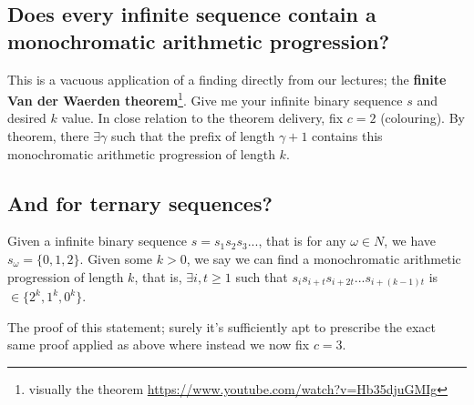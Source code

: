 \documentclass{article}
\begin{document}
\subsection{Does every infinite sequence contain a monochromatic arithmetic progression?}
This is a vacuous application of a finding directly from our lectures; the \textbf{finite Van der Waerden theorem}\footnote{visually the theorem \url{https://www.youtube.com/watch?v=Hb35djuGMIg}}. Give me your infinite binary sequence $s$ and desired $k$ value. In close relation to the theorem delivery, fix $c = 2$ (colouring). By theorem, there $\exists \gamma$ such that the prefix of length $\gamma + 1$ contains this monochromatic arithmetic progression of length $k$.

\subsection{And for ternary sequences?} 
Given a infinite binary sequence $s = s_{1}s_{2}s_{3}...$, that is for any $\omega \in N$, we have $s_{\omega} = \{0, 1, 2\}$. Given some $k > 0$, we say we can find a monochromatic arithmetic progression of length $k$, that is, $\exists i,t \geq 1$ such that $s_{i}s_{i+t}s_{i+2t}...s_{i+(k-1)t}$ is $\in \{2^k,1^k,0^k\}$.

The proof of this statement; surely it's sufficiently apt to prescribe the exact same proof applied as above where instead we now fix $c = 3$.
\end{document}
